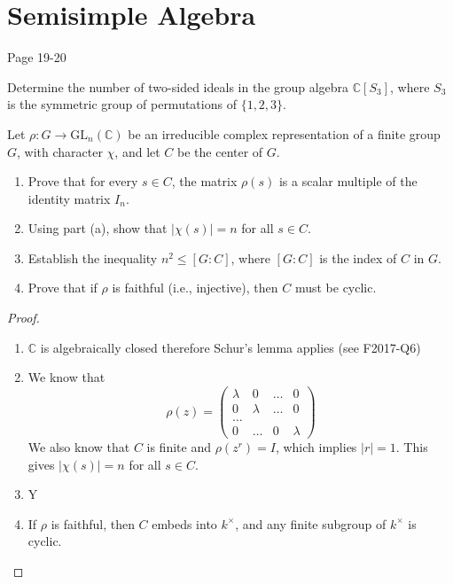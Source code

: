 


\chapter{Semisimple Algebra}
Page 19-20

\begin{prob}[F2019-Q5]
    Determine the number of two-sided ideals in the group algebra \(\mathbb{C}[S_3]\), where \(S_3\) is the symmetric group of permutations of \(\{1, 2, 3\}\).
\end{prob}



\begin{prob}[F2009-Q6, F2001-Q5]
    Let \( \rho \colon G \to \mathrm{GL}_n(\mathbb{C}) \) be an irreducible complex representation of a finite group \( G \), with character \( \chi \), and let \( C \) be the center of \( G \).
    
    \begin{enumerate}
        \item Prove that for every \( s \in C \), the matrix \( \rho(s) \) is a scalar multiple of the identity matrix \( I_n \).
        
        \item Using part (a), show that \( |\chi(s)| = n \) for all \( s \in C \).
        
        \item Establish the inequality \( n^2 \leq [G : C] \), where \( [G : C] \) is the index of \( C \) in \( G \).
        
        \item Prove that if \( \rho \) is faithful (i.e., injective), then \( C \) must be cyclic.
    \end{enumerate}
\end{prob}
\begin{proof}
    \begin{enumerate}
        \item $\mathbb{C}$ is algebraically closed therefore Schur's lemma applies (see F2017-Q6)
        \item We know that 
        \begin{equation*}
            \rho(z)=\begin{pmatrix}
                \lambda&0&\dots&0\\
                0&\lambda&\dots&0\\
                \dots\\
                0&\dots&0&\lambda
            \end{pmatrix}
        \end{equation*}
        We also know that $C$ is finite and $\rho(z^r)=I$, which implies $|r|=1$. This gives $|\chi(s)|=n$ for all $s\in C$. 
        \item Y
        \item If $\rho$ is faithful, then $C$ embeds into $k^\times$, and any finite subgroup of $k^\times$ is cyclic.
    \end{enumerate}
\end{proof}

